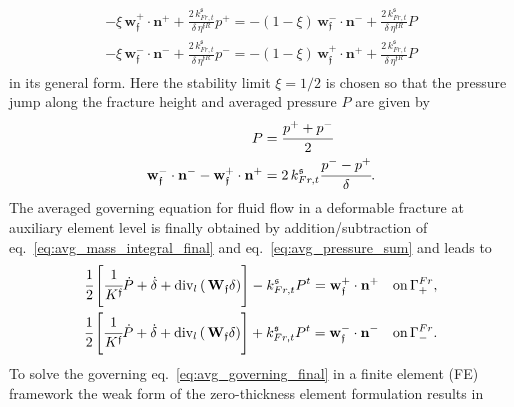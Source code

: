 \begin{align}
\label{eq:avg_balance}
\begin{split}
-\xi \, \mathbf{w}^+_\mathfrak{f} \cdot \mathbf{n}^+ + \frac{2 \, k^\mathfrak{s}_{Fr,t}}{\delta \, \eta^{\mathfrak{f}R}} p^+ =  - (1 - \xi) \, \mathbf{w}^-_\mathfrak{f} \cdot \mathbf{n}^- + \frac{2 \, k^\mathfrak{s}_{Fr,t}}{\delta \, \eta^{\mathfrak{f}R}} P\\
-\xi \, \mathbf{w}^-_\mathfrak{f} \cdot \mathbf{n}^- + \frac{2 \, k^\mathfrak{s}_{Fr,t}}{\delta \, \eta^{\mathfrak{f}R}} p^- =  - (1 - \xi) \, \mathbf{w}^+_\mathfrak{f} \cdot \mathbf{n}^+ + \frac{2 \, k^\mathfrak{s}_{Fr,t}}{\delta \, \eta^{\mathfrak{f}R}} P
\end{split}
\end{align}
in its general form. Here the stability limit $\xi=1 / 2$ \cite{segura2004} is chosen \cite{Martin2005} so that the pressure jump along the fracture height and averaged pressure $P$ are given by
\begin{align}
    \label{eq:avg_pressure_sum}
    \begin{split}
        P &= \cfrac{p^{+} +  p^{-}}{2}\\
        \mathbf{w}^-_\mathfrak{f} \cdot \mathbf{n}^- - \mathbf{w}^+_\mathfrak{f} \cdot \mathbf{n}^+ &= 2 \, k^\mathfrak{s}_{Fr,t} \cfrac{p^- - p^+}{\delta}.
    \end{split}
\end{align}
The averaged governing equation for fluid flow in a deformable fracture at auxiliary element level is finally obtained by addition/subtraction of eq.~\eqref{eq:avg_mass_integral_final} and eq.~\eqref{eq:avg_pressure_sum} and leads to
\begin{align}
    \label{eq:avg_governing_final}
    \begin{split}
    \cfrac{1}{2}\left[\cfrac{1}{K^\mathfrak{f}}\dot{P} + \dot{\delta} + \text{div}_l \left(\, \mathbf{W}_\mathfrak{f} \delta \right)\right] -  k^\mathfrak{s}_{Fr,t} P^t = \mathbf{w}^+_\mathfrak{f} \cdot \mathbf{n^+} \quad \text{on} \, \Gamma^{Fr}_+,\\
\cfrac{1}{2}\left[\cfrac{1}{K^\mathfrak{f}}\dot{P} + \dot{\delta} + \text{div}_l
\left(\, \mathbf{W}_\mathfrak{f} \delta \right)\right] +  k^\mathfrak{s}_{Fr,t} P^t = \mathbf{w}^-_\mathfrak{f} \cdot \mathbf{n^-} \quad \text{on} \, \Gamma^{Fr}_-.
    \end{split}
\end{align}
To solve the governing eq.~\eqref{eq:avg_governing_final} in a finite element (FE) framework the weak form of the zero-thickness element formulation results in
